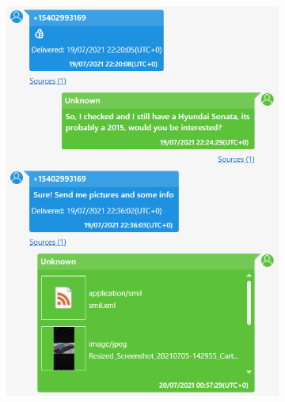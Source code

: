 \documentclass[12pt]{article}
\begin{document}
\begin{figure}[!ht]
\begin{subfigure}[b]{0.3\textwidth}
        \includegraphics[width=\textwidth]{images/ss3.png}
        \caption{}
    \end{subfigure}
    \begin{subfigure}[b]{0.3\textwidth}
        \centering

\end{subfigure}
\end{figure}
\end{document}
